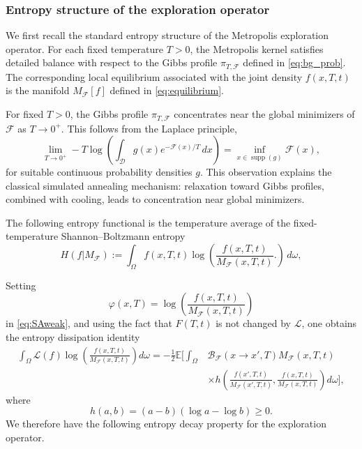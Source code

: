 \documentclass[10pt,a4paper]{article}
\theoremstyle{theorem}
\numberwithin{equation}{section}
\begin{document}
\subsubsection{Entropy structure of the exploration operator}
\label{subsec:analysis_entropies}

We first recall the standard entropy structure of the Metropolis exploration
operator. For each fixed temperature \(T>0\), the Metropolis kernel satisfies
detailed balance with respect to the Gibbs profile \(\pi_{T,\mathcal F}\) defined
in \eqref{eq:bg_prob}. The corresponding local equilibrium associated with the
joint density \(f(x,T,t)\) is the manifold \(M_{\mathcal F}[f]\) defined
in \eqref{eq:equilibrium}.

For fixed \(T>0\), the Gibbs profile \(\pi_{T,\mathcal F}\) concentrates near the
global minimizers of \(\mathcal F\) as \(T\to0^+\). This follows from the Laplace
principle,
\begin{equation}
\label{eq:laplace}
\lim_{T\rightarrow 0^+}
-T\log\left(
\int_{\mathcal D}g(x)e^{-\mathcal F(x)/T}\,dx
\right)
=
\inf_{x\in\operatorname{supp}(g)}\mathcal F(x),
\end{equation}
for suitable continuous probability densities \(g\). This observation explains
the classical simulated annealing mechanism: relaxation toward Gibbs profiles,
combined with cooling, leads to concentration near global minimizers.

The following entropy functional is the temperature average of the fixed-temperature
Shannon--Boltzmann entropy
\begin{equation}
\label{eq:entr}
H(f|M_{\mathcal F})
:=
\int_{\Omega}
f(x,T,t)\log\left(
\frac{f(x,T,t)}{M_{\mathcal F}(x,T,t)}.
\right)\,d\omega,
\end{equation}

Setting
\[
\varphi(x,T)
=
\log\left(
\frac{f(x,T,t)}{M_{\mathcal F}(x,T,t)}
\right)
\]
in \eqref{eq:SAweak}, and using the fact that \(F(T,t)\) is not changed by
\(\mathcal L\), one obtains the entropy dissipation identity
\begin{equation}
\label{eq:SAentr_long}
\begin{split}
\int_{\Omega}\mathcal L(f)
\log\left(
\frac{f(x,T,t)}{M_{\mathcal F}(x,T,t)}
\right)d\omega
=
-\frac12\mathbb E\bigg[
\int_{\Omega}
&\mathcal B_{\mathcal F}(x\rightarrow x',T)
M_{\mathcal F}(x,T,t)
\\
&\times
h\left(
\frac{f(x',T,t)}{M_{\mathcal F}(x',T,t)},
\frac{f(x,T,t)}{M_{\mathcal F}(x,T,t)}
\right)d\omega
\bigg],
\end{split}
\end{equation}
where
\[
h(a,b)=(a-b)(\log a-\log b)\ge0.
\]
We therefore have the following entropy decay property for the exploration
operator.
\end{document}
